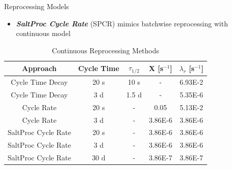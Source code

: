 \documentclass[final]{beamer}
\newlength{\onecolwid}
\newlength{\threecolwid}
\begin{document}
\begin{frame}[t]
\begin{columns}[t,totalwidth=\threecolwid]
\begin{column}{\onecolwid}
\begin{block}{Reprocessing Models}
\begin{itemize}
	\item \textbf{\emph{SaltProc Cycle Rate}} (SPCR) mimics batchwise reprocessing with continuous model
\end{itemize}


\begin{table}[H]
\renewcommand{\arraystretch}{1.25}
\caption{Continuous Reprocessing Methods}
\label{tab:cont_methods}
\begin{center}
\begin{tabular}{ | c | c | c | c | c | }
 \hline
	Approach & Cycle Time & $\tau_{1/2}$ & X [s$^{-1}$] & $\lambda_{r}$ [s$^{-1}$]\\
 \hline
 \hline
 Cycle Time Decay & 20 s & 10 s & - & 6.93E-2\\
 Cycle Time Decay & 3 d & 1.5 d & - & 5.35E-6\\
 Cycle Rate & 20 s & - & 0.05 & 5.13E-2\\
 Cycle Rate & 3 d & - & 3.86E-6 & 3.86E-6\\
 SaltProc Cycle Rate & 20 s & - & 3.86E-6 & 3.86E-6\\
 SaltProc Cycle Rate & 3 d & - & 3.86E-6 & 3.86E-6\\
 SaltProc Cycle Rate & 30 d & - & 3.86E-7 & 3.86E-7\\
 
 \hline
\end{tabular}
\end{center}
\end{table}




\end{block}
\end{column}
\end{columns}
\end{frame}
\end{document}
